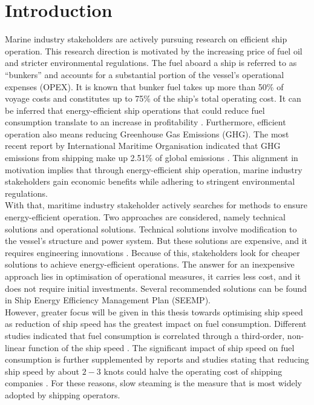 \chapter{Introduction} \label{chp:introduction}

Marine industry stakeholders are actively pursuing research on efficient ship operation. This research direction is motivated by the increasing price of fuel oil and stricter environmental regulations. The fuel aboard a ship is referred to as ``bunkers'' and accounts for a substantial portion of the vessel's operational expenses (OPEX). It is known that bunker fuel takes up more than 50\% of voyage costs and constitutes up to 75\% of the ship's total operating cost. It can be inferred that energy-efficient ship operations that could reduce fuel consumption translate to an increase in profitability . Furthermore, efficient operation also means reducing Greenhouse Gas Emissions (GHG). The most recent report by International Maritime Organisation indicated that GHG emissions from shipping make up 2.51\% of global emissions . This alignment in motivation implies that through energy-efficient ship operation, marine industry stakeholders gain economic benefits while adhering to stringent environmental regulations. \\

With that, maritime industry stakeholder actively searches for methods to ensure energy-efficient operation. Two approaches are considered, namely technical solutions and operational solutions. Technical solutions involve modification to the vessel's structure and power system. But these solutions are expensive, and it requires engineering innovations . Because of this, stakeholders look for cheaper solutions to achieve energy-efficient operations. The answer for an inexpensive approach lies in optimisation of operational measures, it carries less cost, and it does not require initial investments. Several recommended solutions can be found in Ship Energy Efficiency Management Plan (SEEMP).\\ 

However, greater focus will be given in this thesis towards optimising ship speed as reduction of ship speed has the greatest impact on fuel consumption. Different studies indicated that fuel consumption is correlated through a third-order, non-linear function of the ship speed . The significant impact of ship speed on fuel consumption is further supplemented by reports and studies stating that reducing ship speed by about $2-3$ knots could halve the operating cost of shipping companies . For these reasons, slow steaming is the measure that is most widely adopted by shipping operators. \\

